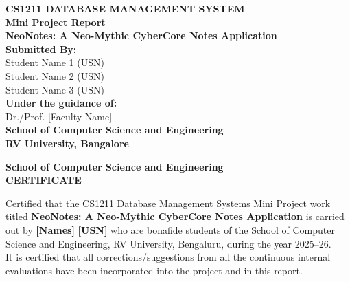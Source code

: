 \documentclass[12pt,a4paper]{report}
\begin{document}
\begin{titlepage}
    \centering
    \vspace*{2cm}
    
    {\Large \textbf{CS1211 DATABASE MANAGEMENT SYSTEM}} \\
    \vspace{0.5cm}
    {\Large \textbf{Mini Project Report}} \\
    
    \vspace{2.5cm}
    {\huge \textbf{NeoNotes: A Neo-Mythic CyberCore Notes Application}} \\
    
    \vspace{3cm}
    \textbf{Submitted By:} \\
    Student Name 1 (USN) \\
    Student Name 2 (USN) \\
    Student Name 3 (USN) \\
    
    \vspace{2cm}
    \textbf{Under the guidance of:} \\
    Dr./Prof. [Faculty Name] \\
    
    \vfill
    \textbf{School of Computer Science and Engineering} \\
    \textbf{RV University, Bangalore} \\
    \vspace{1cm}
\end{titlepage}

\newpage
\begin{center}
    \textbf{School of Computer Science and Engineering} \\
    \vspace{1cm}
    {\Large \textbf{CERTIFICATE}}
\end{center}
\vspace{1cm}
\noindent Certified that the CS1211 Database Management Systems Mini Project work titled \textbf{NeoNotes: A Neo-Mythic CyberCore Notes Application} is carried out by \textbf{[Names]} \textbf{[USN]} who are bonafide students of the School of Computer Science and Engineering, RV University, Bengaluru, during the year 2025--26. \\

\noindent It is certified that all corrections/suggestions from all the continuous internal evaluations have been incorporated into the project and in this report.
\end{document}
